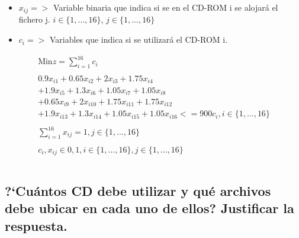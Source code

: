\documentclass[10pt, a4paper]{article}
\begin{document}
			\begin{itemize}

				\item \(x_{ij} => \) Variable binaria que indica si se en el CD-ROM i se alojará el fichero j.  $i \in \{1,...,16\}$, $j \in \{1,...,16\}$

				\item \(c_{i} => \) Variables que indica si se utilizará el CD-ROM i.
			\end{itemize}
			\[
				\begin{split}
					\text{Min} z = \sum_{i=1}^{16} c_{i} \\ \\
						0.9x_{i1} + 0.65x_{i2} + 2x_{i3} + 1.75x_{i4} \\
						+ 1.9x_{i5} + 1.3x_{i6} + 1.05 x_{i7} + 1.05 x_{i8} \\
						+ 0.65x_{i9} + 2x_{i10} + 1.75x_{i11}  + 1.75x_{i12}\\
						+ 1.9x_{i13} + 1.3x_{i14} + 1.05 x_{i15} + 1.05 x_{i16} <= 900c_{i}, i \in \{1,...,16\}\\ \\
					 	\sum_{i=1}^{16} x_{ij} = 1, j \in \{1,...,16\}\\ \\
						c_{i}, x_{ij} \in {0,1}, i \in \{1,...,16\},j \in \{1,...,16\}\\ \\
				\end{split}
			\]
		\subsection{?`Cuántos CD debe utilizar y qué archivos debe ubicar en cada uno de ellos? Justificar la respuesta.}
\end{document}

